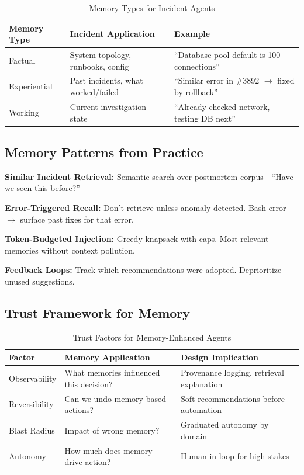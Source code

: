 \begin{table}[htbp]
\centering
\caption{Memory Types for Incident Agents}
\label{tab:memory-types}
\begin{tabular}{lll}
\toprule
\textbf{Memory Type} & \textbf{Incident Application} & \textbf{Example} \\
\midrule
Factual & System topology, runbooks, config & ``Database pool default is 100 connections'' \\
Experiential & Past incidents, what worked/failed & ``Similar error in \#3892 $\rightarrow$ fixed by rollback'' \\
Working & Current investigation state & ``Already checked network, testing DB next'' \\
\bottomrule
\end{tabular}
\end{table}

\subsection{Memory Patterns from Practice}
\label{subsec:memory-patterns}

\textbf{Similar Incident Retrieval:} Semantic search over postmortem corpus---``Have we seen this before?''

\textbf{Error-Triggered Recall:} Don't retrieve unless anomaly detected. Bash error $\rightarrow$ surface past fixes for that error.

\textbf{Token-Budgeted Injection:} Greedy knapsack with caps. Most relevant memories without context pollution.

\textbf{Feedback Loops:} Track which recommendations were adopted. Deprioritize unused suggestions.

\subsection{Trust Framework for Memory}
\label{subsec:memory-trust}

\begin{table}[htbp]
\centering
\caption{Trust Factors for Memory-Enhanced Agents}
\label{tab:memory-trust}
\begin{tabular}{lll}
\toprule
\textbf{Factor} & \textbf{Memory Application} & \textbf{Design Implication} \\
\midrule
Observability & What memories influenced this decision? & Provenance logging, retrieval explanation \\
Reversibility & Can we undo memory-based actions? & Soft recommendations before automation \\
Blast Radius & Impact of wrong memory? & Graduated autonomy by domain \\
Autonomy & How much does memory drive action? & Human-in-loop for high-stakes \\
\bottomrule
\end{tabular}
\end{table}

